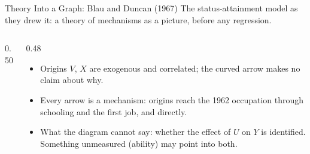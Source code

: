 \documentclass[aspectratio=169,11pt,xcolor=dvipsnames]{beamer}
\begin{document}
\begin{frame}{Theory Into a Graph: Blau and Duncan (1967)}
The status-attainment model as they drew it: a theory of mechanisms as a
picture, before any regression.
\begin{columns}[c]
\begin{column}{0.50\textwidth}
\centering
{}
\end{column}
\begin{column}{0.48\textwidth}
\begin{itemize}\itemsep3pt
  \item Origins $V$, $X$ are exogenous and correlated; the curved arrow
        makes no claim about why.
  \item Every arrow is a mechanism: origins reach the 1962 occupation
        through schooling and the first job, and directly.
  \item What the diagram cannot say: whether the effect of $U$ on $Y$ is
        identified. Something unmeasured (ability) may point into both.
\end{itemize}
\end{column}
\end{columns}
\end{frame}
\end{document}
